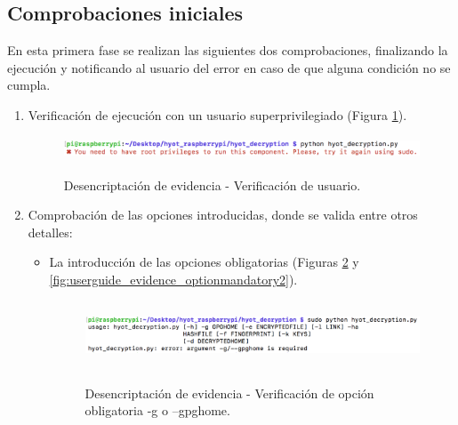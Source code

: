 \documentclass[12pt,a4paper, twoside]{report}
\begin{document}
	\newpage
			 
	 \subsection{Comprobaciones iniciales}
	 
	 En esta primera fase se realizan las siguientes dos comprobaciones, finalizando la ejecución y notificando al usuario del error en caso de que alguna condición no se cumpla. 
	 
	 \begin{enumerate}
	 	\item Verificación de ejecución con un usuario superprivilegiado (Figura \ref{fig:userguide_evidence_root}).
		
		\begin{figure}[!ht]   
			\caption{Desencriptación de evidencia - Verificación de usuario.} 
			\begin{center} 
				\includegraphics[width=12cm,height=0.7cm]{Images/userGuide/evidence/root} \\
				\label{fig:userguide_evidence_root} 
			\end{center}  
		\end{figure}
	 	
	 	\item Comprobación de las opciones introducidas, donde se valida entre otros detalles:
	 	
	 	\begin{itemize}
	 		\item La introducción de las opciones obligatorias (Figuras \ref{fig:userguide_evidence_optionmandatory1} y \ref{fig:userguide_evidence_optionmandatory2}).
	 		
	 		\begin{figure}[!ht]   
				\caption{Desencriptación de evidencia - Verificación de opción obligatoria -g o --gpghome.} 
				\begin{center} 
					\includegraphics[width=14cm,height=2cm]{Images/userGuide/evidence/option_mandatory1} \\
					\label{fig:userguide_evidence_optionmandatory1} 
				\end{center}  
			\end{figure}
			

\end{itemize}
\end{enumerate}
\end{document}
